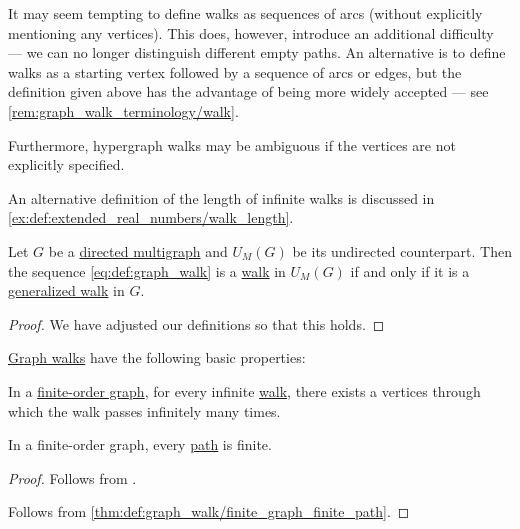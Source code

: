 \begin{comments}
  \item It may seem tempting to define walks as sequences of arcs (without explicitly mentioning any vertices). This does, however, introduce an additional difficulty --- we can no longer distinguish different empty paths. An alternative is to define walks as a starting vertex followed by a sequence of arcs or edges, but the definition given above has the advantage of being more widely accepted --- see \cref{rem:graph_walk_terminology/walk}.

  Furthermore, hypergraph walks may be ambiguous if the vertices are not explicitly specified.

  \item An alternative definition of the length of infinite walks is discussed in \cref{ex:def:extended_real_numbers/walk_length}.
\end{comments}

\begin{proposition}\label{thm:walk_in_undirected_counterpart}
  Let \( G \) be a \hyperref[def:directed_multigraph]{directed multigraph} and \( \hyperref[def:graph_functors/multi_forgetful]{U_M}(G) \) be its undirected counterpart. Then the sequence \eqref{eq:def:graph_walk} is a \hyperref[def:graph_walk/undirected]{walk} in \( \hyperref[def:graph_functors/multi_forgetful]{U_M}(G) \) if and only if it is a \hyperref[def:graph_walk/generalized]{generalized walk} in \( G \).
\end{proposition}
\begin{proof}
  We have adjusted our definitions so that this holds.
\end{proof}

\begin{proposition}\label{thm:def:graph_walk}
  \hyperref[def:graph_walk]{Graph walks} have the following basic properties:
  \begin{thmenum}
     In a \hyperref[def:graph_cardinality/order]{finite-order graph}, for every infinite \hyperref[def:graph_walk]{walk}, there exists a vertices through which the walk passes infinitely many times.

     In a finite-order graph, every \hyperref[def:graph_walk/path]{path} is finite.
  \end{thmenum}
\end{proposition}
\begin{proof}
   Follows from .

   Follows from \cref{thm:def:graph_walk/finite_graph_finite_path}.
\end{proof}

